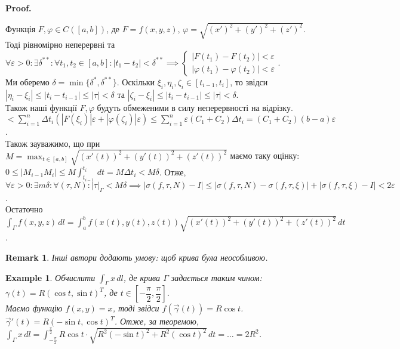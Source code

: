 \documentclass[a4paper, 10pt]{article}
\makeatletter
\def\qed{$\blacksquare$}
\theoremstyle{theoremdd}
\theoremstyle{theoremdd}
\theoremstyle{theoremdd}
\theoremstyle{theoremdd}
\theoremstyle{theoremdd}
\newtheorem{example}[theorem]{Example}
\theoremstyle{theoremdd}
\theoremstyle{theoremdd}
\theoremstyle{theoremdd}
\theoremstyle{theoremdd}
\theoremstyle{theoremdd}
\theoremstyle{theoremdd}
\newtheorem{remark}[theorem]{Remark}
\theoremstyle{theoremdd}
\theoremstyle{theoremdd}
\theoremstyle{theoremdd}
\theoremstyle{theoremdd}
\renewenvironment{proof}[1][Proof.\\]{\par
\pushQED{\hfill \qed}%
\normalfont \topsep6\p@\@plus6\p@\relax
\trivlist
\item\relax
{\bfseries
#1\@addpunct{.}}\hspace\labelsep\ignorespaces
}{%
\popQED\endtrivlist\@endpefalse
}
\makeatother
\begin{document}
\begin{proof}
Функція $F,\varphi \in C([a,b])$, де $F = f(x,y,z)$, $\varphi = \sqrt{(x')^2 + (y')^2 + (z')^2}$. Тоді рівномірно неперервні та\\
$\forall \varepsilon > 0: \exists \delta^{**}: \forall t_1,t_2 \in [a,b]: |t_1-t_2| < \delta^{**} \implies \begin{cases} |F(t_1)-F(t_2)| < \varepsilon \\ |\varphi(t_1) - \varphi(t_2)| < \varepsilon \end{cases}$.\\
Ми оберемо $\delta = \min \{ \delta^*, \delta^{**}\}$. Оскільки $\xi_i,\eta_i,\zeta_i \in [t_{i-1},t_i]$, то звідси $|\eta_i - \xi_i| \leq |t_i - t_{i-1}| \leq |\tau| < \delta$ та $|\zeta_i - \xi_i| \leq |t_i - t_{i-1}| \leq |\tau| < \delta$.\\
Також наші функції $F,\varphi$ будуть обмеженими в силу неперервності на відрізку.\\
$< \displaystyle\sum_{i=1}^n \Delta t_i ( |F(\xi_i)| \varepsilon + |\varphi(\zeta_i)| \varepsilon ) \leq \sum_{i=1}^n \varepsilon(C_1+C_2) \Delta t_i = (C_1+C_2)(b-a)\varepsilon$.\\
Також зауважимо, що при $M = \displaystyle\max_{t \in [a,b]} \sqrt{(x'(t))^2 + (y'(t))^2 + (z'(t))^2}$ маємо таку оцінку:\\
$0 \leq |M_{i-1}M_i| \leq M \displaystyle\int_{t_{i-1}}^{t_i}\,dt = M \Delta t_i < M \delta$. Отже, \\
$\forall \varepsilon > 0: \exists m \delta: \forall (\tau, N): |\tau|_\Gamma < M \delta \implies |\sigma(f,\tau,N) - I| \leq |\sigma(f,\tau,N) - \sigma(f,\tau,\xi)| + |\sigma(f,\tau,\xi) - I| < 2\varepsilon$.\\
Остаточно $\displaystyle\int_\Gamma f(x,y,z)\,dl = \int_a^b f(x(t),y(t),z(t)) \sqrt{(x'(t))^2 + (y'(t))^2 + (z'(t))^2}\,dt$.
\end{proof}

\begin{remark}
Інші автори додають умову: щоб крива була неособливою.
\end{remark}

\begin{example}
Обчислити $\displaystyle\int_\Gamma x\,dl$, де крива $\Gamma$ задається таким чином:\\
$\gamma(t) = R(\cos t, \sin t)^T$, де $t \in \left[ -\dfrac{\pi}{2}, \dfrac{\pi}{2} \right]$.\\
Маємо функцію $f(x,y) = x$, тоді звідси $f(\vec{\gamma}(t)) = R \cos t$.\\
$\vec{\gamma}'(t) = R (-\sin t, \cos t)^T$. Отже, за теоремою, \\ $\displaystyle\int_\Gamma x\,dl = \int_{-\frac{\pi}{2}}^{\frac{\pi}{2}} R \cos t \cdot \sqrt{R^2 (-\sin t)^2 + R^2 (\cos t)^2}\,dt = \dots = 2R^2$.
\end{example}
\end{document}
